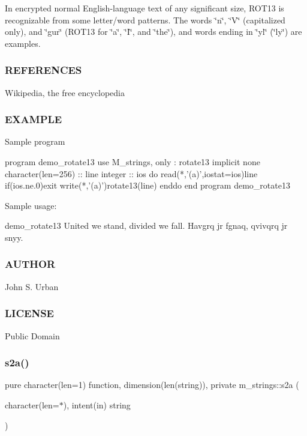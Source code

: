 In encrypted normal English-\/language text of any significant size, R\+O\+T13 is recognizable from some letter/word patterns. The words \char`\"{}n\char`\"{}, \char`\"{}\+V\char`\"{} (capitalized only), and \char`\"{}gur\char`\"{} (R\+O\+T13 for \char`\"{}a\char`\"{}, \char`\"{}\+I\char`\"{}, and \char`\"{}the\char`\"{}), and words ending in \char`\"{}yl\char`\"{} (\char`\"{}ly\char`\"{}) are examples.

\subsubsection*{R\+E\+F\+E\+R\+E\+N\+C\+ES}

Wikipedia, the free encyclopedia \subsubsection*{E\+X\+A\+M\+P\+LE}

Sample program \begin{DoxyVerb}program demo_rotate13
use M_strings, only : rotate13
implicit none
character(len=256) :: line
integer            :: ios
do
   read(*,'(a)',iostat=ios)line
   if(ios.ne.0)exit
   write(*,'(a)')rotate13(line)
enddo
end program demo_rotate13
\end{DoxyVerb}


Sample usage\+: \begin{DoxyVerb}demo_rotate13
United we stand, divided we fall.
Havgrq jr fgnaq, qvivqrq jr snyy.
\end{DoxyVerb}


\subsubsection*{A\+U\+T\+H\+OR}

John S. Urban \subsubsection*{L\+I\+C\+E\+N\+SE}

Public Domain \mbox{\label{namespacem__strings_a5b05f337c8851871a4fb0b3cf56663cd}} 
\subsubsection{\texorpdfstring{s2a()}{s2a()}}
{\footnotesize\ttfamily pure character(len=1) function, dimension(len(string)), private m\+\_\+strings\+::s2a (\begin{DoxyParamCaption}\item[{character(len=$\ast$), intent(in)}]{string }\end{DoxyParamCaption})\hspace{0.3cm}{\ttfamily [private]}}

